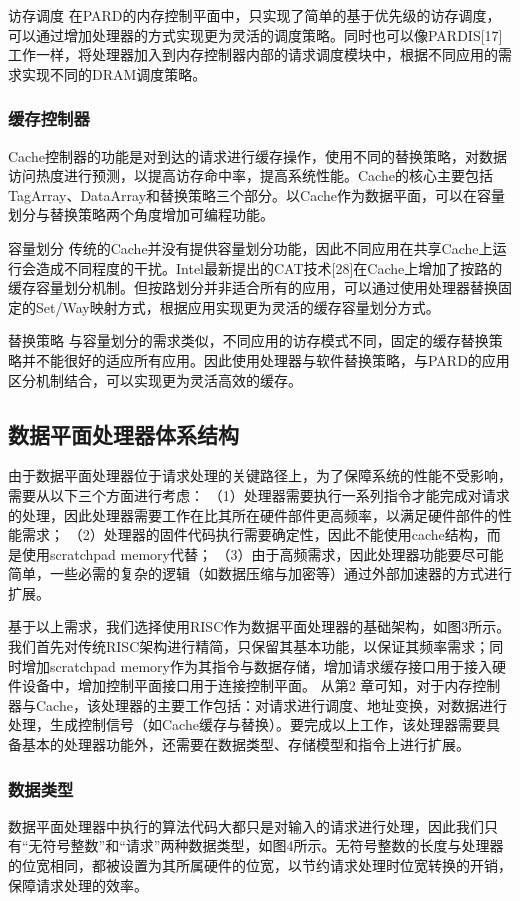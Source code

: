 访存调度 在PARD的内存控制平面中，只实现了简单的基于优先级的访存调度，可以通过增加处理器的方式实现更为灵活的调度策略。同时也可以像PARDIS[17]工作一样，将处理器加入到内存控制器内部的请求调度模块中，根据不同应用的需求实现不同的DRAM调度策略。

\subsubsection*{缓存控制器}
Cache控制器的功能是对到达的请求进行缓存操作，使用不同的替换策略，对数据访问热度进行预测，以提高访存命中率，提高系统性能。Cache的核心主要包括TagArray、DataArray和替换策略三个部分。以Cache作为数据平面，可以在容量划分与替换策略两个角度增加可编程功能。

容量划分 传统的Cache并没有提供容量划分功能，因此不同应用在共享Cache上运行会造成不同程度的干扰。Intel最新提出的CAT技术[28]在Cache上增加了按路的缓存容量划分机制。但按路划分并非适合所有的应用，可以通过使用处理器替换固定的Set/Way映射方式，根据应用实现更为灵活的缓存容量划分方式。

替换策略 与容量划分的需求类似，不同应用的访存模式不同，固定的缓存替换策略并不能很好的适应所有应用。因此使用处理器与软件替换策略，与PARD的应用区分机制结合，可以实现更为灵活高效的缓存。


\subsection{数据平面处理器体系结构}

由于数据平面处理器位于请求处理的关键路径上，为了保障系统的性能不受影响，需要从以下三个方面进行考虑：
（1）处理器需要执行一系列指令才能完成对请求的处理，因此处理器需要工作在比其所在硬件部件更高频率，以满足硬件部件的性能需求；
（2）处理器的固件代码执行需要确定性，因此不能使用cache结构，而是使用scratchpad memory代替；
（3）由于高频需求，因此处理器功能要尽可能简单，一些必需的复杂的逻辑（如数据压缩与加密等）通过外部加速器的方式进行扩展。
 
基于以上需求，我们选择使用RISC作为数据平面处理器的基础架构，如图3所示。我们首先对传统RISC架构进行精简，只保留其基本功能，以保证其频率需求；同时增加scratchpad memory作为其指令与数据存储，增加请求缓存接口用于接入硬件设备中，增加控制平面接口用于连接控制平面。
从第2 章可知，对于内存控制器与Cache，该处理器的主要工作包括：对请求进行调度、地址变换，对数据进行处理，生成控制信号（如Cache缓存与替换）。要完成以上工作，该处理器需要具备基本的处理器功能外，还需要在数据类型、存储模型和指令上进行扩展。

\subsubsection{数据类型}
数据平面处理器中执行的算法代码大都只是对输入的请求进行处理，因此我们只有“无符号整数”和“请求”两种数据类型，如图4所示。无符号整数的长度与处理器的位宽相同，都被设置为其所属硬件的位宽，以节约请求处理时位宽转换的开销，保障请求处理的效率。
 
